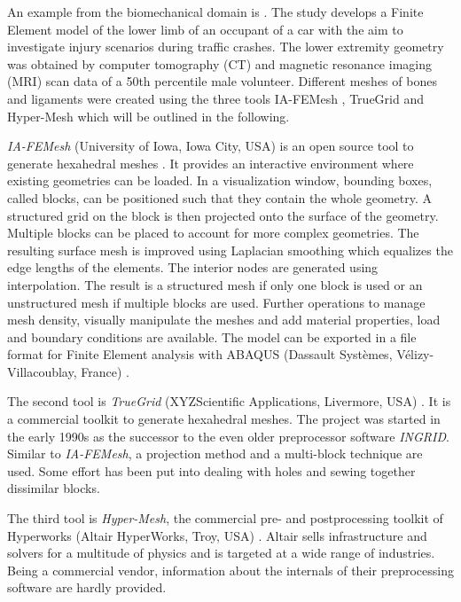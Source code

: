 An example from the biomechanical domain is \cite{untaroiu2013finite}. The study develops a Finite Element model of the lower limb of an occupant of a car with the aim to investigate injury scenarios during traffic crashes.
The lower extremity geometry was obtained by computer tomography (CT) and magnetic resonance imaging (MRI) scan data of a 50th percentile male volunteer. Different meshes of bones and ligaments were created using the three tools IA-FEMesh \cite{grosland2009ia}, TrueGrid \cite{TrueGrid} and Hyper-Mesh \cite{Hypermesh} which will be outlined in the following.

\emph{IA-FEMesh} (University of Iowa, Iowa City, USA) is an open source tool to generate hexahedral meshes \cite{grosland2009ia}. It provides an interactive environment where existing geometries can be loaded. In a visualization window, bounding boxes, called blocks, can be positioned such that they contain the whole geometry. A structured grid on the block is then projected onto the surface of the geometry. Multiple blocks can be placed to account for more complex geometries. The resulting surface mesh is improved using Laplacian smoothing which equalizes the edge lengths of the elements.
The interior nodes are generated using interpolation.
The result is a structured mesh if only one block is used or an unstructured mesh if multiple blocks are used. Further operations to manage mesh density, visually manipulate the meshes and add material properties, load and boundary conditions are available. The model can be exported in a file format for Finite Element analysis with ABAQUS (Dassault Systèmes, Vélizy-Villacoublay, France) \cite{ABAQUS}.

The second tool is \emph{TrueGrid} (XYZScientific Applications, Livermore, USA) \cite{TrueGrid}. It is a commercial toolkit to generate hexahedral meshes. The project was started in the early 1990s as the successor to the even older preprocessor software \emph{INGRID}. Similar to \emph{IA-FEMesh}, a projection method and a multi-block technique are used. Some effort has been put into dealing with holes and sewing together dissimilar blocks.

The third tool is \emph{Hyper-Mesh}, the commercial pre- and postprocessing toolkit of Hyperworks (Altair HyperWorks, Troy, USA) \cite{Hypermesh}.
Altair sells infrastructure and solvers for a multitude of physics and is targeted at a wide range of industries. 
Being a commercial vendor, information about the internals of their preprocessing software are hardly provided.

